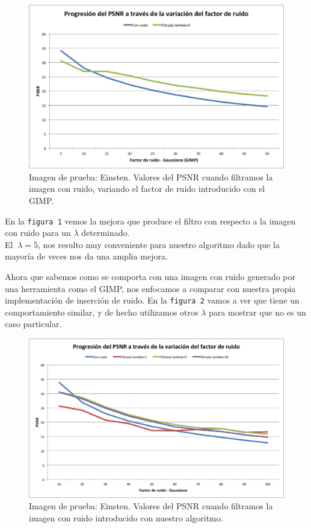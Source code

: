 \documentclass[a4paper]{article}
\begin{document}
\begin{figure}[H]
  \centering
  \includegraphics[scale=0.75]{graficos/PSNR_Einstein-GIMP.png}
  \caption{ Imagen de prueba: Einsten. Valores del PSNR cuando filtramos la imagen con ruido, variando el factor de ruido introducido con el GIMP.}
\end{figure}

En la \texttt{figura 1}  vemos la mejora que produce el filtro con respecto a la imagen con ruido para un $\lambda$ determinado. \\ 
El $\ \lambda = 5$, nos resulto muy conveniente para nuestro algoritmo dado que la mayoría de veces nos da una amplia mejora. 

Ahora que sabemos como se comporta con una imagen con ruido generado por una herramienta como el GIMP, nos enfocamos a comparar con nuestra propia implementación de inserción de ruido.
En la \texttt{figura 2} vamos a ver que tiene un comportamiento similar, y de hecho utilizamos otros $\lambda$ para mostrar que no es un caso particular. 
\begin{figure}[H]
  \centering
  \includegraphics[scale=0.65]{graficos/PSNR_Einstein.png}
  \caption{ Imagen de prueba: Einsten. Valores del PSNR cuando filtramos la imagen con ruido introducido con nuestro algoritmo. }
\end{figure}
\end{document}
